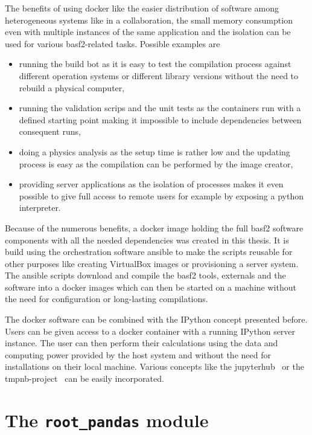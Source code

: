 The benefits of using docker like the easier distribution of software among heterogeneous systems like in a collaboration, the small memory consumption even with multiple instances of the same application and the isolation can be used for various basf2-related tasks. Possible examples are
\begin{itemize}
 \item running the build bot as it is easy to test the compilation process against different operation systems or different library versions without the need to rebuild a physical computer,
 \item running the validation scrips and the unit tests as the containers run with a defined starting point making it impossible to include dependencies between consequent runs,
 \item doing a physics analysis as the setup time is rather low and the updating process is easy as the compilation can be performed by the image creator,
 \item providing server applications as the isolation of processes makes it even possible to give full access to remote users for example by exposing a python interpreter.
\end{itemize}

Because of the numerous benefits, a docker image holding the full basf2 software components with all the needed dependencies was created in this thesis. It is build using the orchestration software ansible \cite{ansible} to make the scripts reusable for other purposes like creating VirtualBox images or provisioning a server system. The ansible scripts download and compile the basf2 tools, externals and the software into a docker images which can then be started on a machine without the need for configuration or long-lasting compilations.

The docker software can be combined with the IPython concept presented before. Users can be given access to a docker container with a running IPython server instance. The user can then perform their calculations using the data and computing power provided by the host system and without the need for installations on their local machine. Various concepts like the jupyterhub~\cite{jupyterhub} or the tmpnb-project~\cite{tmpnb} can be easily incorporated. 

\section{The \texttt{root\_pandas} module}

